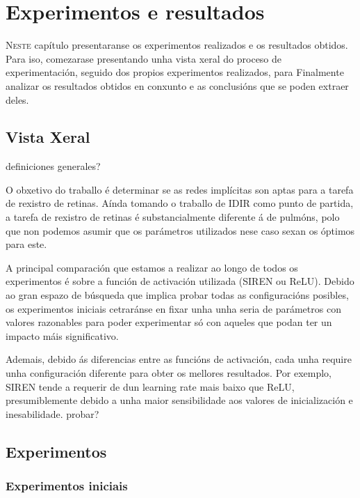 \chapter{Experimentos e resultados}
\label{chap:Experimentos e resultados}
\lettrine{N}{este} capítulo presentaranse os experimentos realizados e os resultados obtidos.
Para iso, comezarase presentando unha vista xeral do proceso de experimentación, 
seguido dos propios experimentos realizados, para 
Finalmente analizar os resultados obtidos en conxunto e as conclusións que se poden extraer deles.

\section{Vista Xeral}
\label{sec:Vista Xeral}

definiciones generales?

O obxetivo do traballo é determinar se as redes implícitas son aptas para a tarefa de rexistro de retinas.
Aínda tomando o traballo de IDIR como punto de partida, a tarefa de rexistro de retinas é substancialmente diferente á de pulmóns, polo que non podemos asumir que os parámetros utilizados nese caso sexan os óptimos para este.

A principal comparación que estamos a realizar ao longo de todos os experimentos é sobre a función de activación utilizada (SIREN ou ReLU).
Debido ao gran espazo de búsqueda que implica probar todas as configuracións posibles, 
os experimentos iniciais cetraránse en fixar unha unha seria de parámetros con valores razonables para poder experimentar só con aqueles que podan ter un impacto máis significativo.

Ademais, debido ás diferencias entre as funcións de activación, cada unha require unha configuración diferente para obter os mellores resultados.
Por exemplo, SIREN tende a requerir de dun learning rate mais baixo que ReLU, presumiblemente debido a unha maior sensibilidade aos valores de inicialización e inesabilidade.
probar?

\section{Experimentos}
\label{sec:Experimentos}

\subsection{Experimentos iniciais}
\label{subsec:Experimentos iniciais}

